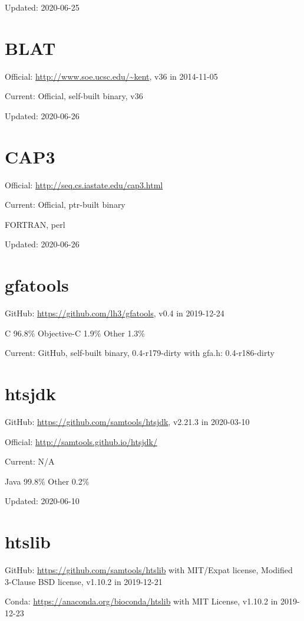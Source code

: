 \documentclass[]{article}
\begin{document}
Updated: 2020-06-25

\section{BLAT}

Official: \url{http://www.soe.ucsc.edu/~kent}, v36 in 2014-11-05

Current: Official, self-built binary, v36

Updated: 2020-06-26

\section{CAP3}

Official: \url{http://seq.cs.iastate.edu/cap3.html}

Current: Official, ptr-built binary

FORTRAN, perl

Updated: 2020-06-26

\section{gfatools}

GitHub: \url{https://github.com/lh3/gfatools}, v0.4 in 2019-12-24

C 96.8\% Objective-C 1.9\% Other 1.3\%

Current: GitHub, self-built binary, 0.4-r179-dirty with gfa.h: 0.4-r186-dirty


\section{htsjdk}

GitHub: \url{https://github.com/samtools/htsjdk}, v2.21.3 in 2020-03-10

Official: \url{http://samtools.github.io/htsjdk/}

Current: N/A

Java 99.8\% Other 0.2\% 

Updated: 2020-06-10

\section{htslib}

GitHub: \url{https://github.com/samtools/htslib} with MIT/Expat license, Modified 3-Clause BSD license, v1.10.2 in 2019-12-21 

Conda: \url{https://anaconda.org/bioconda/htslib} with MIT License, v1.10.2 in 2019-12-23
\end{document}

